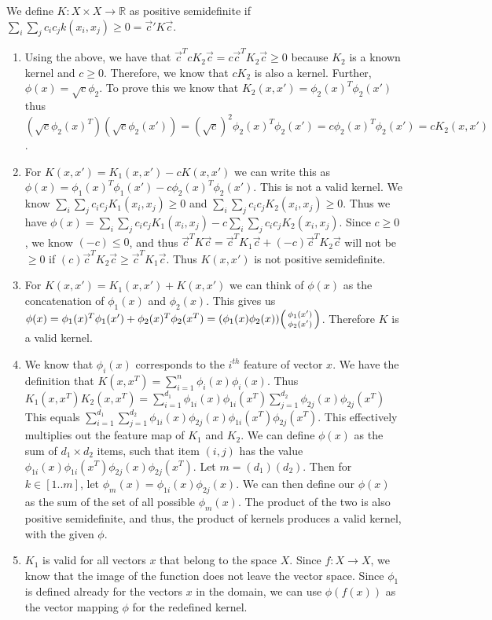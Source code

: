 \documentclass[english]{article}
\begin{document}
We define $K: X \times X \rightarrow \mathbb{R}$ as positive semidefinite if $\sum_{i} \sum_{j} c_i c_j k(x_i, x_j) \geq 0  = \vec{c}'K\vec{c}$.
\begin{enumerate}
\item Using the above, we have that $\vec{c}^TcK_2\vec{c} = c \vec{c}^T K_2 \vec{c} \geq 0$ because $K_2$ is a known kernel and $c \geq 0$. Therefore, we know that $cK_2$ is also a kernel. Further, $\phi(x) = \sqrt{c}\phi_2$. To prove this we know that $K_2(x,x') = \phi_2(x)^T\phi_2(x')$ thus  $(\sqrt{c}\phi_2(x)^T)(\sqrt{c}\phi_2(x')) = (\sqrt{c})^2 \phi_2(x)^T\phi_2(x') = c  \phi_2(x)^T\phi_2(x') = cK_2(x,x')$. 
\item For $K(x,x') = K_1(x,x') - cK(x,x')$ we can write this as $\phi(x) = \phi_1(x)^T\phi_1(x') - c\phi_2(x)^T\phi_2(x')$. This is not a valid kernel. We know $\sum_{i} \sum_{j} c_i c_j K_1(x_i, x_j) \geq 0$ and $\sum_{i} \sum_{j} c_i c_j K_2(x_i, x_j) \geq 0$. Thus we have $\phi(x) = \sum_{i} \sum_{j} c_i c_j K_1(x_i, x_j) - c\sum_{i} \sum_{j} c_i c_j K_2(x_i, x_j)$. Since $c \geq 0$, we know $(-c) \leq 0$, and thus $\vec{c}^TK\vec{c} = \vec{c}^TK_1\vec{c} + (-c)\vec{c}^TK_2\vec{c}$ will not be $\geq 0$ if $(c)\vec{c}^TK_2\vec{c} \geq \vec{c}^TK_1\vec{c}$. Thus $K(x, x')$ is not positive semidefinite. 
\item For $K(x,x') = K_1(x,x')  + K(x,x')$ we can think of $\phi(x)$ as the concatenation of $\phi_1(x)$ and $\phi_2(x)$. This gives us $\phi(x) = \phi_1(x)^T\phi_1(x') + \phi_2(x)^T\phi_2(x^T) = (\phi_1(x)\phi_2(x))\begin{psmallmatrix}\phi_1(x')\\\phi_2(x')\end{psmallmatrix}$. Therefore $K$ is a valid kernel.
\item We know that $\phi_i(x)$ corresponds to the $i^{th}$ feature of vector $x$. We have the definition that $K(x,x^T) = \sum_{i=1}^{n} \phi_i(x)\phi_i(x
)$. Thus $K_1(x, x^T)K_2(x, x^T) = \sum_{i=1}^{d_1} \phi_{1i}(x)\phi_{1i}(x^T)\sum_{j=1}^{d_2}\phi_{2j}(x)\phi_{2j}(x^T)$ This equals $\sum_{i=1}^{d_1} \sum_{j=1}^{d_2} \phi_{1i}(x)\phi_{2j}(x)\phi_{1i}(x^T)\phi_{2j}(x^T)$. This effectively multiplies out the feature map of $K_1$ and $K_2$. We can define $\phi(x)$ as the sum of $d_1\times d_2$ items, such that item $(i, j)$ has the value $\phi_{1i}(x)\phi_{1i}(x^T)\phi_{2j}(x)\phi_{2j}(x^T)$. Let $m = (d_1)(d_2)$. Then for $k \in [1..m]$, let $\phi_m(x) = \phi_{1i}(x)\phi_{2j}(x)$. We can then define our $\phi(x)$ as the sum of the set of all possible $\phi_m(x)$. The product of the two is also positive semidefinite, and thus, the product of kernels produces a valid kernel, with the given $\phi$. 
\item $K_1$ is valid for all vectors $x$ that belong to the space $X$. Since $f: X \rightarrow X$, we know that the image of the function does not leave the vector space. Since $\phi_1$ is defined already for the vectors $x$ in the domain, we can use $\phi(f(x))$ as the vector mapping $\phi$ for the redefined kernel.
\end{enumerate}
\end{document}
